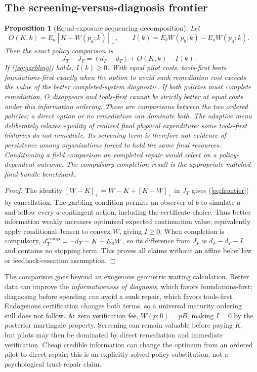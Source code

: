 \documentclass[11pt]{article}
\newtheorem{proposition}{Proposition}
\begin{document}
\subsection{The screening-versus-diagnosis frontier}
\begin{proposition}[Equal-exposure sequencing decomposition]\label{prop:frontier}
Let
\begin{equation}
 O(K,k)=E_a[K-W(p_a;k)]_+,
 \qquad I(k)=E_bW(p_b;k)-E_aW(p_a;k).
\end{equation}
Then the exact policy comparison is
\begin{equation}
 J_T-J_F=(d_F-d_T)+O(K,k)-I(k).\label{eq:frontier}
\end{equation}
If (\ref{eq:garbling}) holds, $I(k)\geq0$. With equal pilot costs, tools-first beats foundations-first exactly when the option to avoid sunk remediation cost exceeds the value of the better completed-system diagnostic. If both policies must complete remediation, $O$ disappears and tools-first cannot be strictly better at equal costs under this information ordering. These are comparisons between the two ordered policies; a direct option or no remediation can dominate both. The adaptive menu deliberately relaxes equality of realized final physical expenditure: some tools-first histories do not remediate. Its screening term is therefore not evidence of persistence among organizations forced to hold the same final resources. Conditioning a field comparison on completed repair would select on a policy-dependent outcome. The compulsory-completion result is the appropriate matched-final-bundle benchmark.
\end{proposition}
\begin{proof}
The identity $[W-K]_+=W-K+[K-W]_+$ in $J_T$ gives (\ref{eq:frontier}) by cancellation. The garbling condition permits an observer of $b$ to simulate $a$ and follow every $a$-contingent action, including the certificate choice. Thus better information weakly increases optimized expected continuation value; equivalently apply conditional Jensen to convex $W$, giving $I\geq0$. When completion is compulsory, $J_T^{\rm comp}=-d_T-K+E_aW$, so its difference from $J_F$ is $d_F-d_T-I$ and contains no stopping term. This proves all claims without an affine belief law or feedback-cessation assumption.
\end{proof}
The comparison goes beyond an exogenous geometric waiting calculation. Better data can improve the \emph{informativeness of diagnosis}, which favors foundations-first; diagnosing before spending can avoid a sunk repair, which favors tools-first. Endogenous certification changes both terms, so a universal maturity ordering still does not follow. At zero verification fee, $W(p;0)=pB$, making $I=0$ by the posterior martingale property. Screening can remain valuable before paying $K$, but pilots may then be dominated by direct remediation and immediate verification. Cheap credible information can change the optimum from an ordered pilot to direct repair; this is an explicitly solved policy substitution, not a psychological trust-repair claim.
\end{document}

